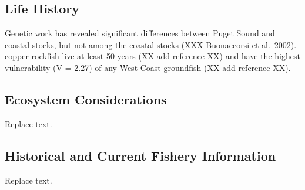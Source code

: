 \documentclass[11pt,
  english,
  a4paper,
]{article}
\begin{document}
\leavevmode\tagmcend\tagstructend\par


\hypertarget{life-history}{%
\subsection{Life History}\label{life-history}}

\leavevmode\tagmcend\tagstructend


Genetic work has revealed significant differences between Puget Sound and coastal stocks, but not among the coastal stocks (XXX Buonaccorsi et al.~2002). copper rockfish live at least 50 years (XX add reference XX) and have the highest vulnerability (V = 2.27) of any West Coast groundfish (XX add reference XX).

\leavevmode\tagmcend\tagstructend\par


\hypertarget{ecosystem-considerations}{%
\subsection{Ecosystem Considerations}\label{ecosystem-considerations}}

\leavevmode\tagmcend\tagstructend


Replace text.

\leavevmode\tagmcend\tagstructend\par


\hypertarget{historical-and-current-fishery-information}{%
\subsection{Historical and Current Fishery Information}\label{historical-and-current-fishery-information}}

\leavevmode\tagmcend\tagstructend


Replace text.

\leavevmode\tagmcend\tagstructend\par
\end{document}
